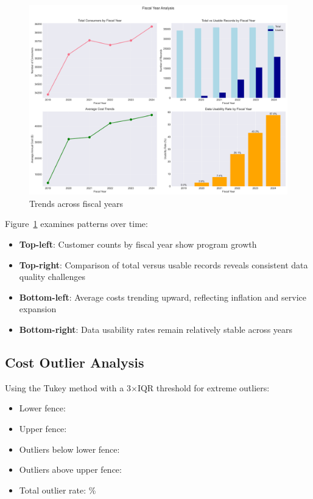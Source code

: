 \begin{figure}[h]
    \centering
    \includegraphics[width=\textwidth]{figures/fiscal_year_trends.png}
    \caption{Trends across fiscal years}
    \label{fig:fiscal_year_trends}
\end{figure}

Figure~\ref{fig:fiscal_year_trends} examines patterns over time:
\begin{itemize}
    \item \textbf{Top-left}: Customer counts by fiscal year show program growth
    \item \textbf{Top-right}: Comparison of total versus usable records reveals consistent data quality challenges
    \item \textbf{Bottom-left}: Average costs trending upward, reflecting inflation and service expansion
    \item \textbf{Bottom-right}: Data usability rates remain relatively stable across years
\end{itemize}

\subsection{Cost Outlier Analysis}

Using the Tukey method with a 3$\times$IQR threshold for extreme outliers:
\begin{itemize}
    \item Lower fence: \OutlierLowerFence
    \item Upper fence: \OutlierUpperFence
    \item Outliers below lower fence: \OutliersBelow
    \item Outliers above upper fence: \OutliersAbove
    \item Total outlier rate: \OutlierRate\%
\end{itemize}

